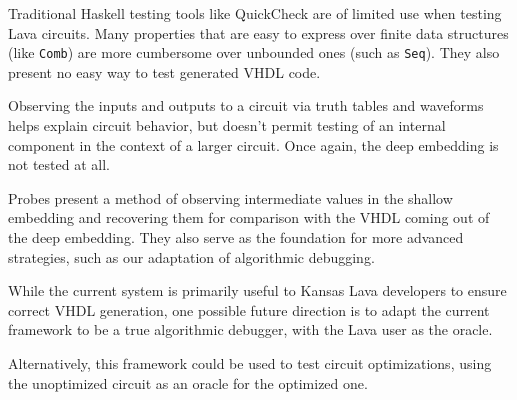 \documentclass{llncs}
\begin{document}
Traditional Haskell testing tools like QuickCheck are of limited use
when testing Lava circuits. Many properties that are easy to express
over finite data structures (like \verb!Comb!) are more cumbersome
over unbounded ones (such as \verb!Seq!). They also present no easy
way to test generated VHDL code.

Observing the inputs and outputs to a circuit via truth tables and
waveforms helps explain circuit behavior, but doesn't permit testing
of an internal component in the context of a larger circuit. Once again,
the deep embedding is not tested at all.

Probes present a method of observing intermediate values in the shallow
embedding and recovering them for comparison with the VHDL coming out of
the deep embedding. They also serve as the foundation for more advanced 
strategies, such as our adaptation of algorithmic debugging.

While the current system is primarily useful to Kansas Lava developers to
ensure correct VHDL generation, one possible future direction is to adapt 
the current framework to be a true algorithmic debugger, with the Lava
user as the oracle.

Alternatively, this framework could be used to test circuit optimizations,
using the unoptimized circuit as an oracle for the optimized one.


\end{document}
